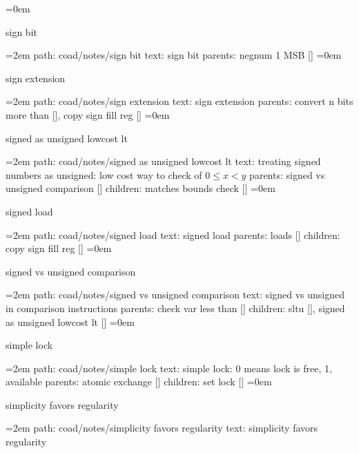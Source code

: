 \leftskip=0em
\par\endgroup
\bigskip
{}
sign bit
\smallskip
\par\begingroup
\leftskip=2em
path: coad/notes/sign bit
\smallskip
text:  sign bit
\smallskip
parents:  negnum 1 MSB []
\smallskip
\leftskip=0em
\par\endgroup
\bigskip
{}
sign extension
\smallskip
\par\begingroup
\leftskip=2em
path: coad/notes/sign extension
\smallskip
text:  sign extension
\smallskip
parents:  convert n bits more than [], copy sign fill reg []
\smallskip
\leftskip=0em
\par\endgroup
\bigskip
{}
signed as unsigned lowcost lt
\smallskip
\par\begingroup
\leftskip=2em
path: coad/notes/signed as unsigned lowcost lt
\smallskip
text:  treating signed numbers as unsigned: low cost way to check of $0 \le x < y$
\smallskip
parents:  signed vs unsigned comparison []
\smallskip
children: matches bounds check []
\smallskip
\leftskip=0em
\par\endgroup
\bigskip
{}
signed load
\smallskip
\par\begingroup
\leftskip=2em
path: coad/notes/signed load
\smallskip
text:  signed load
\smallskip
parents:  loads []
\smallskip
children: copy sign fill reg []
\smallskip
\leftskip=0em
\par\endgroup
\bigskip
{}
signed vs unsigned comparison
\smallskip
\par\begingroup
\leftskip=2em
path: coad/notes/signed vs unsigned comparison
\smallskip
text:  signed vs unsigned in comparison instructions
\smallskip
parents:  check var less than []
\smallskip
children: sltu [], signed as unsigned lowcost lt []
\smallskip
\leftskip=0em
\par\endgroup
\bigskip
{}
simple lock
\smallskip
\par\begingroup
\leftskip=2em
path: coad/notes/simple lock
\smallskip
text:  simple lock: 0 means lock is free, 1, available
\smallskip
parents:  atomic exchange []
\smallskip
children: set lock []
\smallskip
\leftskip=0em
\par\endgroup
\bigskip
{}
simplicity favors regularity
\smallskip
\par\begingroup
\leftskip=2em
path: coad/notes/simplicity favors regularity
\smallskip
text:  simplicity favors regularity
